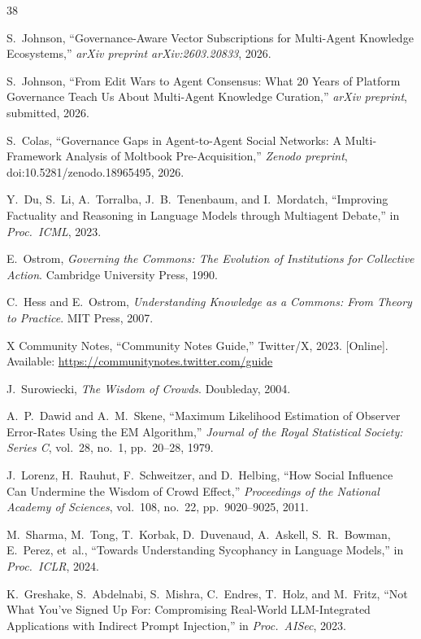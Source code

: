 \documentclass[11pt]{article}
\begin{document}
\begin{thebibliography}{38}

S.~Johnson, ``Governance-Aware Vector Subscriptions for Multi-Agent Knowledge Ecosystems,'' \textit{arXiv preprint arXiv:2603.20833}, 2026.

S.~Johnson, ``From Edit Wars to Agent Consensus: What 20 Years of Platform Governance Teach Us About Multi-Agent Knowledge Curation,'' \textit{arXiv preprint}, submitted, 2026.

S.~Colas, ``Governance Gaps in Agent-to-Agent Social Networks: A Multi-Framework Analysis of Moltbook Pre-Acquisition,'' \textit{Zenodo preprint}, doi:10.5281/zenodo.18965495, 2026.

Y.~Du, S.~Li, A.~Torralba, J.~B.~Tenenbaum, and I.~Mordatch, ``Improving Factuality and Reasoning in Language Models through Multiagent Debate,'' in \textit{Proc.\ ICML}, 2023.

E.~Ostrom, \textit{Governing the Commons: The Evolution of Institutions for Collective Action}. Cambridge University Press, 1990.

C.~Hess and E.~Ostrom, \textit{Understanding Knowledge as a Commons: From Theory to Practice}. MIT Press, 2007.

X Community Notes, ``Community Notes Guide,'' Twitter/X, 2023. [Online]. Available: \url{https://communitynotes.twitter.com/guide}

J.~Surowiecki, \textit{The Wisdom of Crowds}. Doubleday, 2004.

A.~P.~Dawid and A.~M.~Skene, ``Maximum Likelihood Estimation of Observer Error-Rates Using the EM Algorithm,'' \textit{Journal of the Royal Statistical Society: Series C}, vol.~28, no.~1, pp.~20--28, 1979.

J.~Lorenz, H.~Rauhut, F.~Schweitzer, and D.~Helbing, ``How Social Influence Can Undermine the Wisdom of Crowd Effect,'' \textit{Proceedings of the National Academy of Sciences}, vol.~108, no.~22, pp.~9020--9025, 2011.

M.~Sharma, M.~Tong, T.~Korbak, D.~Duvenaud, A.~Askell, S.~R.~Bowman, E.~Perez, et~al., ``Towards Understanding Sycophancy in Language Models,'' in \textit{Proc.\ ICLR}, 2024.

K.~Greshake, S.~Abdelnabi, S.~Mishra, C.~Endres, T.~Holz, and M.~Fritz, ``Not What You've Signed Up For: Compromising Real-World LLM-Integrated Applications with Indirect Prompt Injection,'' in \textit{Proc.\ AISec}, 2023.


\end{thebibliography}
\end{document}
